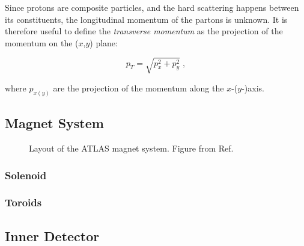 Since protons are composite particles, and the hard scattering happens between its constituents, the longitudinal momentum of the partons is unknown. It is therefore useful to define the \textit{transverse momentum} as the projection of the momentum on the ($x$,$y$) plane: 

\begin{equation}
\label{eq:cern:pt}
p_T = \sqrt{p_x^2 + p_y^2} \; ,
\end{equation}

where $p_{x(y)}$ are the projection of the momentum along the $x$-($y$-)axis.




\subsection{Magnet System}

\label{sec:cern:atlasmagnets}
\begin{figure}[ht]
\centering
{}
\caption{Layout of the ATLAS magnet system. Figure from Ref. \cite{Goodson}}
\label{fig:atlas:magnet}
\end{figure}



\subsubsection*{Solenoid}

\subsubsection*{Toroids}



\subsection{Inner Detector}

